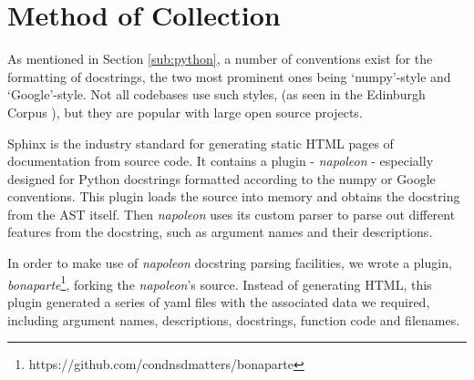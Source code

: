 \section{Method of Collection} %
\label{sec:method_of_collection}

As mentioned in Section \ref{sub:python}, a number of conventions exist for the formatting of docstrings, the two most prominent ones being `numpy'-style and `Google'-style.
Not all codebases use such styles, (as seen in the Edinburgh Corpus \cite{barone_parallel_2017}), but they are popular with large open source projects. 

Sphinx is the industry standard for generating static HTML pages of documentation from source code. It contains a plugin - \textit{napoleon} - especially designed for Python docstrings formatted according to the numpy or Google conventions. 
This plugin loads the source into memory and obtains the docstring from the AST itself.
Then \textit{napoleon} uses its custom parser to parse out different features from the docstring, such as argument names and their descriptions.

In order to make use of \textit{napoleon} docstring parsing facilities, we wrote a plugin, \textit{bonaparte}\footnote{https://github.com/condnsdmatters/bonaparte}, forking the \textit{napoleon}'s source. 
Instead of generating HTML, this plugin generated a series of yaml files with the associated data we required, including argument names, descriptions, docstrings, function code and filenames.
 

